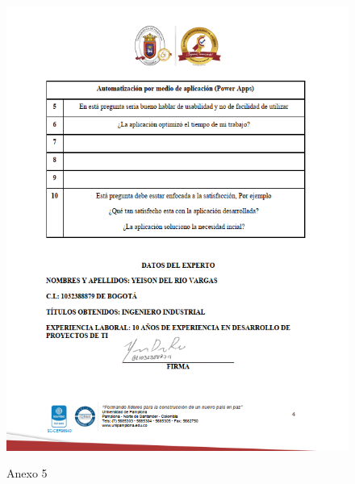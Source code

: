 \begin{figure}[H]
	\centering
	\includegraphics[scale=0.4]{Capitulo6/4}
	\label{anexo4}
	\caption{Anexo 5}
\end{figure}

